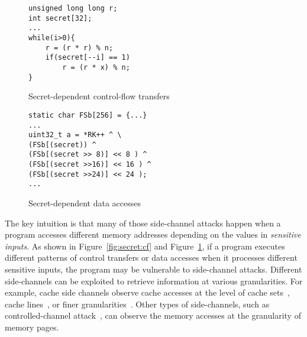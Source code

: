 \begin{figure}[tbp]
    \noindent\begin{minipage}{0.45\linewidth}
        \noindent
        \begin{lstlisting}[numbers = none]
unsigned long long r;
int secret[32];
...
while(i>0){
    r = (r * r) % n;
    if(secret[--i] == 1)
        r = (r * x) % n;   
}
        \end{lstlisting}
\vspace*{-9pt}
        \caption{Secret-dependent control-flow transfers}
        \label{fig:secret:cf}
    \end{minipage}
    \hfill
    \begin{minipage}{0.45\linewidth}
        \begin{lstlisting}[numbers = none]
static char FSb[256] = {...}
... 
uint32_t a = *RK++ ^ \ 
(FSb[(secret)) ^
(FSb[(secret >> 8)] << 8 ) ^
(FSb[(secret >>16)] << 16 ) ^
(FSb[(secret >>24)] << 24 );
...
        \end{lstlisting}
\vspace*{-9pt}
        \caption{Secret-dependent data accesses}
        \label{fig:secret:da}
    \end{minipage}
\vspace*{-18pt}
\end{figure}

The key intuition is that many of those side-channel attacks happen when a
program accesses different memory addresses depending on the values in
\emph{sensitive inputs}. As shown in Figure~\ref{fig:secret:cf} and Figure~\ref{fig:secret:da}, 
if a program executes different patterns of
control transfers or data accesses when it processes different
sensitive inputs, the program may be vulnerable to side-channel attacks.
Different side-channels can be exploited to retrieve information at
various granularities. For example, cache side channels observe cache
accesses at the level of cache sets~\cite{liu2015last}, cache lines~\cite{184415}, 
or finer granularities~\cite{yarom2017cachebleed,moghimi2020copycat}. 
Other types of side-channels, such as controlled-channel attack~\cite{7163052},
can observe the memory accesses at the granularity of memory pages.

%

